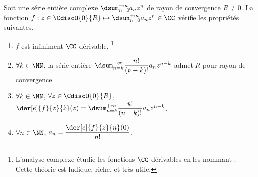 

\begin{preli} \label{der-power-serie}
    Soit une série entière complexe $\dsum_{n=0}^{+\infty} a_n z^n$ de rayon de convergence $R \neq 0$.
    La fonction $f: z \in \CdiscO{0}{R} \mapsto \dsum_{n=0}^{+\infty} a_n z^n \in \CC$ vérifie les propriétés suivantes.
    \begin{enumerate}
    	\item $f$ est infiniment $\CC$-dérivable.%
		\footnote{
			L'analyse complexe étudie les fonctions $\CC$-dérivables en les nommant .
			Cette théorie est ludique, riche, et très utile.
		}

    	\item $\forall k \in \NN$,
		la série entière $\dsum_{n = k}^{+\infty} \dfrac{n!}{(n-k)!} a_n z^{n - k}$ admet $R$ pour rayon de convergence.

    	\item $\forall k \in \NN$, $\forall z \in \CdiscO{0}{R}$,
		$\der[e]{f}{z}{k}(z) = \dsum_{n = k}^{+\infty} \dfrac{n!}{(n-k)!} a_n z^{n - k}$.

    	\item \label{a_n-value}
		$\forall n \in \NN$,  $a_n = \dfrac{\der[e]{f}{z}{n}(0)}{n!}$.
    \end{enumerate}
\end{preli}



